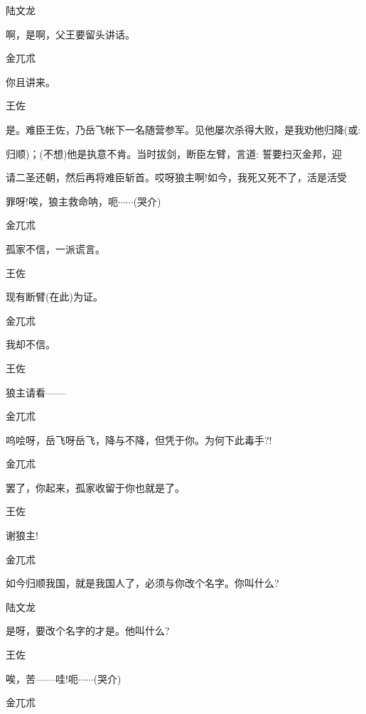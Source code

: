 {{{{陆文龙\hspace{20pt}~

啊，是啊，父王要留头讲话。}

{金兀朮\hspace{20pt}~

你且讲来。}

{王佐

是。难臣王佐，乃岳飞帐下一名随营参军。见他屡次杀得大败，是我劝他归降({\akai 或}: 

归顺)；(不想)他是执意不肯。当时拔剑，断臣左臂，言道: 誓要扫灭金邦，迎

请二圣还朝，然后再将难臣斩首。哎呀狼主啊!如今，我死又死不了，活是活受

罪呀!唉，狼主救命呐，呃$\cdots{}\cdots{}$(哭介)}

{金兀朮\hspace{20pt}~

孤家不信，一派谎言。}

{王佐\hspace{30pt}~

现有断臂(在此)为证。}

{金兀朮\hspace{20pt}~

我却不信。}

{王佐\hspace{30pt}~

狼主请看------}

{金兀朮\hspace{20pt}~

呜哙呀，岳飞呀岳飞，降与不降，但凭于你。为何下此毒手?!}

{金兀朮\hspace{20pt}~

罢了，你起来，孤家收留于你也就是了。}

{王佐\hspace{30pt}~

谢狼主!}

{金兀朮\hspace{20pt}~

如今归顺我国，就是我国人了，必须与你改个名字。你叫什么?}

{陆文龙\hspace{20pt}~

是呀，要改个名字的才是。他叫什么?}

{王佐\hspace{30pt}~

唉，苦------哇!呃$\cdots{}\cdots{}$(哭介)}

{金兀朮\hspace{20pt}~

}}}}
